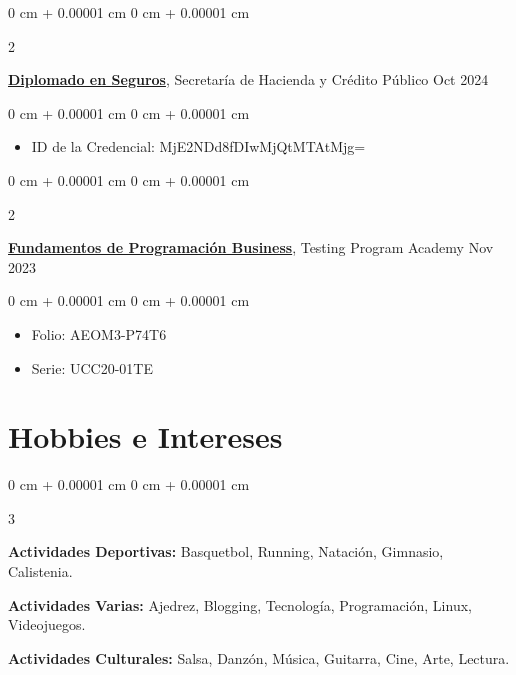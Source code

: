 \documentclass[10pt, letterpaper]{article}
\newenvironment{highlights}{
    \begin{itemize}[
        topsep=0.10 cm,
        parsep=0.10 cm,
        partopsep=0pt,
        itemsep=0pt,
        leftmargin=0 cm + 10pt
    ]
}{
    \end{itemize}
} %
\newenvironment{onecolentry}{
    \begin{adjustwidth}{
        0 cm + 0.00001 cm
    }{
        0 cm + 0.00001 cm
    }
}{
    \end{adjustwidth}
} %
\newenvironment{twocolentry}[2][]{
    \onecolentry
    \def\secondColumn{#2}
    \setcolumnwidth{\fill, 4.5 cm}
    \begin{paracol}{2}
}{
    \switchcolumn \raggedleft \secondColumn
    \end{paracol}
    \endonecolentry
} %
\newenvironment{threecolentry}[3][]{
    \onecolentry
    \def\thirdColumn{#3}
    \setcolumnwidth{, \fill, 4.5 cm}
    \begin{paracol}{3}
    {\raggedright #2} \switchcolumn
}{
    \switchcolumn \raggedleft \thirdColumn
    \end{paracol}
    \endonecolentry
} %
\begin{document}
        \vspace{0.10 cm}
        
        \begin{twocolentry}{
            Oct 2024
        }
            \href{https://diplomadoenseguros.condusef.gob.mx/qr_verifica.php?ida=21647&idg=3}{\textbf{Diplomado en Seguros}}, Secretaría de Hacienda y Crédito Público\end{twocolentry}

        \vspace{0.10 cm}
        \begin{onecolentry}
            \begin{highlights}
                \item ID de la Credencial: MjE2NDd8fDIwMjQtMTAtMjg=
            \end{highlights}
        \end{onecolentry}

        \begin{twocolentry}{
            Nov 2023
        }
            \href{https://testingprogram.com.mx/validar/}{\textbf{Fundamentos de Programación Business}}, Testing Program Academy\end{twocolentry}

        \vspace{0.10 cm}
        \begin{onecolentry}
            \begin{highlights}
                \item Folio: AEOM3-P74T6
                \item Serie: UCC20-01TE
            \end{highlights}
        \end{onecolentry}

 \section{Hobbies e Intereses}

\begin{threecolentry}{
    \textbf{Actividades Deportivas:} Basquetbol, Running, Natación, Gimnasio, Calistenia.
}{
    \textbf{Actividades Culturales:} Salsa, Danzón, Música, Guitarra, Cine, Arte, Lectura. 
}{
    \textbf{Actividades Varias:} Ajedrez, Blogging, Tecnología, Programación, Linux, Videojuegos.
}
\end{threecolentry}
\end{document}
